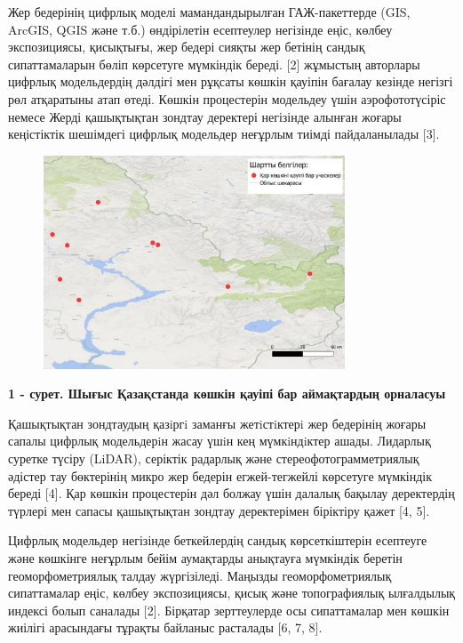 Жер бедерінің цифрлық моделі мамандандырылған ГАЖ-пакеттерде (GIS,
ArcGIS, QGIS және т.б.) өндірілетін есептеулер негізінде еңіс, көлбеу
экспозициясы, қисықтығы, жер бедері сияқты жер бетінің сандық
сипаттамаларын бөліп көрсетуге мүмкіндік береді. {[}2{]} жұмыстың
авторлары цифрлық модельдердің дәлдігі мен рұқсаты көшкін қауіпін
бағалау кезінде негізгі рөл атқаратыны атап өтеді. Көшкін процестерін
модельдеу үшін аэрофототүсіріс немесе Жерді қашықтықтан зондтау
деректері негізінде алынған жоғары кеңістіктік шешімдегі цифрлық
модельдер неғұрлым тиімді пайдаланылады {[}3{]}.


\begin{figure}[H]
	\centering
	\includegraphics[width=0.8\textwidth]{media/ict2/image199}
	\caption*{}
\end{figure}


{\bfseries 1 - сурет. Шығыс Қазақстанда көшкін қауіпі бар аймақтардың
орналасуы}

Қашықтықтан зондтаудың қазiргi заманғы жетiстiктерi жер бедерінің жоғары
сапалы цифрлық модельдерiн жасау үшiн кең мүмкiндiктер ашады. Лидарлық
суретке түсіру (LiDAR), серіктік радарлық және стереофотограмметриялық
әдістер тау бөктерінің микро жер бедерін егжей-тегжейлі көрсетуге
мүмкіндік береді {[}4{]}. Қар көшкін процестерін дәл болжау үшін далалық
бақылау деректердің түрлері мен сапасы қашықтықтан зондтау деректерімен
біріктіру қажет {[}4, 5{]}.

Цифрлық модельдер негізінде беткейлердің сандық көрсеткіштерін есептеуге
және көшкінге неғұрлым бейім аумақтарды анықтауға мүмкіндік беретін
геоморфометриялық талдау жүргізіледі. Маңызды геоморфометриялық
сипаттамалар еңіс, көлбеу экспозициясы, қисық және топографиялық
ылғалдылық индексі болып саналады {[}2{]}. Бірқатар зерттеулерде осы
сипаттамалар мен көшкін жиілігі арасындағы тұрақты байланыс расталады
{[}6, 7, 8{]}.

